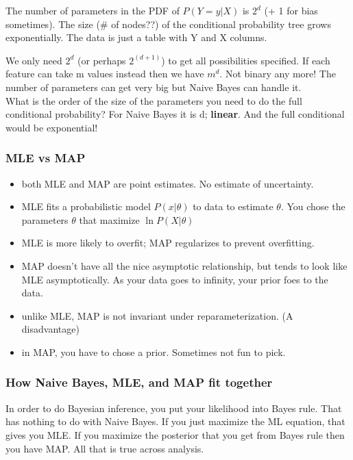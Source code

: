 		The number of parameters in the PDF of $P(Y=y | X)$ is $2^d$ (+ 1 for bias sometimes).  
		The size (\# of nodes??) of the conditional probability tree grows exponentially.
		The data is just a table with Y and X columns.  
		
		We only need $2^d$ (or perhaps $2^{(d+1)}$) to get all possibilities specified.  
            	If each feature can take m values instead then we have $m^d$.  Not binary any more!
		The number of parameters can get very big but Naive Bayes can handle it.  \hfill \\
		
		What is the order of the size of the parameters you need to do the full conditional probability?
		For Naive Bayes it is d; \textbf{linear}.  And the full conditional would be exponential! 
		
\subsubsection{MLE vs MAP}
\begin{itemize}
		\item both MLE and MAP are point estimates.  No estimate of uncertainty.  %
		\item MLE fits a probabilistic model $P(x | \theta)$ to data to estimate $\theta$. %
			You chose the parameters $\theta$ that maximize $\ln P(X | \theta)$
		\item MLE is more likely to overfit; MAP regularizes to prevent overfitting.  \hfill \\  %
		\item MAP doesn't have all the nice asymptotic relationship, but tends to look like MLE asymptotically.
			As your data goes to infinity, your prior foes to the data.  %
		\item unlike MLE, MAP is not invariant under reparameterization.  (A disadvantage)  %
		\item in MAP, you have to chose a prior.  Sometimes not fun to pick.  %
\end{itemize}

\subsubsection{How Naive Bayes, MLE, and MAP fit together}  %
In order to do Bayesian inference, you put your likelihood into Bayes rule.  That has nothing to do with Naive Bayes.
If you just maximize the ML equation, that gives you MLE.
If you maximize the posterior that you get from Bayes rule then you have MAP.  
All that is true across analysis.


